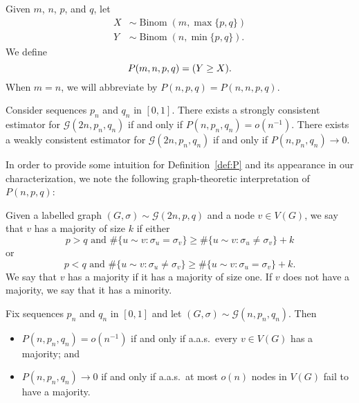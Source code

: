 \documentclass[EJP]{ejpecp}
\newcommand{\1}[1]{\mathbbm{1}_{\{#1\}}}
\newcommand{\calG}{\mathcal{G}}
\let\Pr\relax
\DeclareMathOperator{\Pr}{Pr}
\DeclareMathOperator{\Binom}{Binom}
\begin{document}
\begin{definition}\label{def:P}
 Given $m$, $n$, $p$, and $q$, let
 \begin{align*}
   X &\sim \Binom(m, \max\{p,q\}) \\
   Y &\sim \Binom(n, \min\{p,q\}).
 \end{align*}
 We define
 \[
  P(m, n, p, q) = \Pr(Y \ge X).
 \]
 When $m = n$, we will abbreviate by $P(n, p, q) = P(n, n, p, q)$.
\end{definition}

\begin{theorem}\label{thm:consistency}
 Consider sequences $p_n$ and $q_n$ in $[0, 1]$.
 There exists a strongly consistent estimator for
 $\calG(2n, p_n, q_n)$ if and only if $P(n, p_n, q_n) = o(n^{-1})$.
 There exists a weakly consistent estimator for
 $\calG(2n, p_n, q_n)$ if and only if $P(n, p_n, q_n) \to 0$.
\end{theorem}

In order to provide some intuition for Definition~\ref{def:P} and
its appearance in our characterization, we note the following graph-theoretic
interpretation of $P(n, p, q)$:

\begin{definition}\label{def:majority}
 Given a labelled graph $(G, \sigma) \sim \calG(2n, p, q)$ and a node
 $v \in V(G)$, we say that $v$ has a majority of size $k$ if either
 \[
  p > q \text{ and }
  \#\{u \sim v: \sigma_u = \sigma_v\} \ge \#\{u \sim v: \sigma_u \ne \sigma_v\} + k
 \]
 or
 \[
  p < q \text{ and }
  \#\{u \sim v: \sigma_u \ne \sigma_v\} \ge \#\{u \sim v: \sigma_u = \sigma_v\} + k.
 \]
 We say that $v$ has a majority if it has a majority of size one.
 If $v$ does not have a majority, we say that it has a minority.
\end{definition}

\begin{proposition}\label{prop:majorities}
 Fix sequences $p_n$ and $q_n$ in $[0, 1]$ and let $(G, \sigma) \sim
 \calG(n, p_n, q_n)$. Then
 \begin{itemize}
 \item $P(n, p_n, q_n) = o(n^{-1})$ if and only if
 a.a.s.\ every $v \in V(G)$ has a majority; and
 \item $P(n, p_n, q_n) \to 0$ if and only if
 a.a.s.\ at most $o(n)$ nodes in $V(G)$ fail to have a majority.
 \end{itemize}
\end{proposition}
\end{document}

